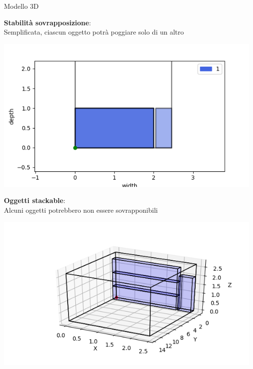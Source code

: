 \documentclass{beamer}
\begin{document}
\begin{frame}{Modello 3D}
	\begin{minipage}[c]{0.45\textwidth}
		\textbf{Stabilit\`a sovrapposizione}:\\ Semplificata, ciascun oggetto potr\`a poggiare solo di un altro
	\end{minipage}
	\hfill
	\begin{minipage}[c]{0.45\textwidth}
		\includegraphics[width=1\linewidth]{figures/3dg}
	\end{minipage}
			
	\begin{minipage}[c]{0.45\textwidth}
		\textbf{Oggetti stackable}:\\ Alcuni oggetti potrebbero non essere sovrapponibili
	\end{minipage}
	\hfill
	\begin{minipage}[c]{0.45\textwidth}
		\includegraphics[width=1\linewidth]{figures/3d}
	\end{minipage}
\end{frame}
\end{document}
